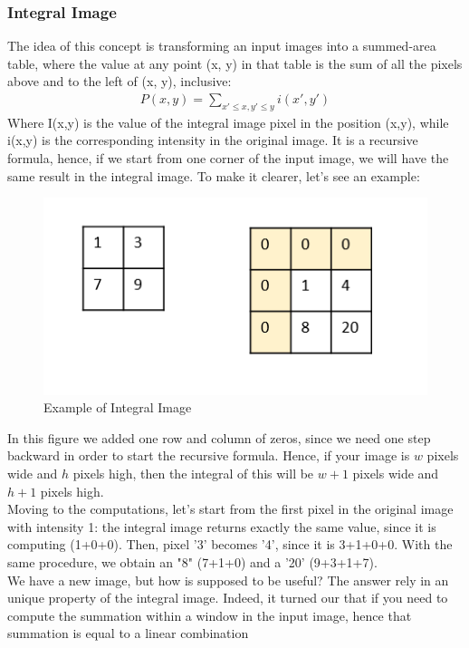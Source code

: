         \subsubsection{Integral Image}
            The idea of this concept is transforming an input images into a summed-area table, where the value at any point (x, y) in that table is the sum of all the pixels above and to the left of (x, y), inclusive:
            \begin{align}
                P(x,y) = \displaystyle\sum_{x' \leq x, y' \leq y} i(x',y')
            \end{align}
            Where I(x,y) is the value of the integral image pixel in the position (x,y), while i(x,y) is the corresponding intensity in the original image. It is a recursive formula, hence, if we start from one corner of the input image, we will have the same result in the integral image. 
            To make it clearer, let’s see an example:
            \begin{figure}[H]
                \centering
                \includegraphics[width=0.6\linewidth]{img/example_integral.png}
                \caption{Example of Integral Image}
            \end{figure}
            In this figure we added one row and column of zeros, since we need one step backward in order to start the recursive formula. Hence, if your image is $w$ pixels wide and $h$ pixels high, then the integral of this will be $w+1$ pixels wide and $h+1$ pixels high. \\ 
            \vspace{3mm}
            Moving to the computations, let's start from the first pixel in the original image with intensity 1: the integral image returns exactly the same value, since it is computing (1+0+0). Then, pixel '3' becomes '4', since it is 3+1+0+0. With the same procedure, we obtain an 
            "8" (7+1+0) and a '20' (9+3+1+7). \\ 
            \vspace{3mm}
            We have a new image, but how is supposed to be useful? The answer rely in an unique property of the integral image. Indeed, it turned our that if you need to compute the summation within a window in the input image, hence that summation is equal to a linear combination 
